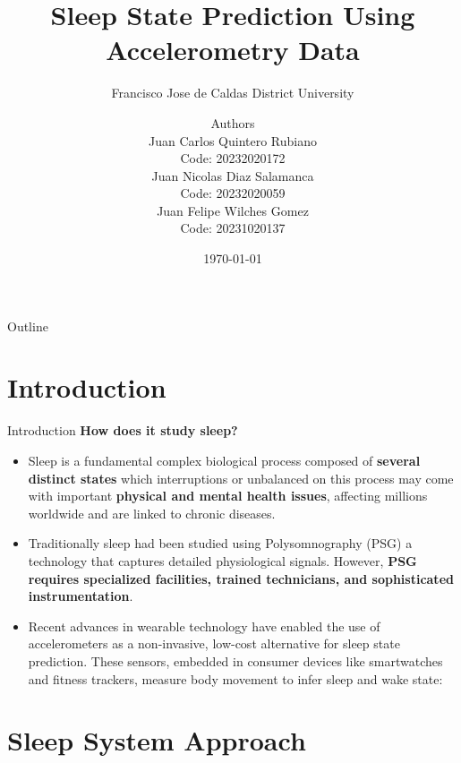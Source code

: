 \documentclass[10pt]{beamer} %
\title{Sleep State Prediction Using Accelerometry Data\space } %
\subtitle{Francisco Jose de Caldas District University} %
\date{\footnotesize \today} %
\author[Authors]{Authors \\ Juan Carlos Quintero Rubiano \\ Code: 20232020172
                \\ Juan Nicolas Diaz Salamanca \\ Code: 20232020059 
                \\ Juan Felipe Wilches Gomez \\ Code: 20231020137}
\institute{Francisco Jose de Caldas District University} %
\begin{document}
\maketitle %

\begin{frame}[plain]{Outline} %
   \tableofcontents %
\end{frame}
\section{Introduction}
\begin{frame}{Introduction} %
\normalsize \centering \textbf{How does it study sleep?}
 \begin{itemize}
     \item \footnotesize Sleep is a fundamental complex biological process composed of \textbf{several distinct states} which interruptions  or unbalanced on this process may come with important  \textbf{physical and mental health issues}, affecting millions worldwide and are linked to chronic diseases.
     \item \footnotesize Traditionally sleep had been studied using Polysomnography (PSG) a technology that captures detailed physiological signals. However, \textbf{PSG requires specialized facilities,
     trained technicians, and sophisticated instrumentation}.
     \item Recent advances in wearable technology have enabled the use of accelerometers as a non-invasive, low-cost alternative for sleep state prediction. These sensors, embedded in consumer devices like smartwatches and fitness trackers, measure body movement to infer sleep and wake state:
 \end{itemize}
        
\end{frame}

\section{Sleep System Approach}
\end{document}
